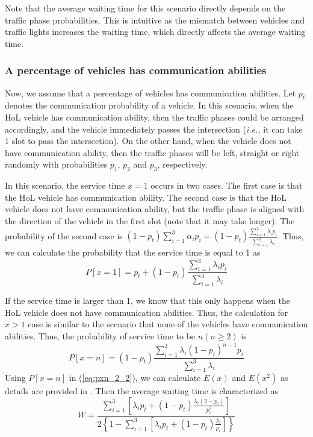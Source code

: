 \documentclass[conference]{IEEEtran}
\newcommand{\ie}{{\em i.e., }}
\begin{document}
Note that the average waiting time for this scenario directly depends on the traffic phase probabilities. This is intuitive as the mismatch between vehicles and traffic lights increases the waiting time, which directly affects the average waiting time.



\subsubsection{A percentage of vehicles has communication abilities}\label{somecarcantellmodel1}
Now, we assume that a percentage of vehicles has communication abilities. Let $p_t$ denotes the communication probability of a vehicle. In this scenario, when the HoL vehicle has communication ability, then the traffic phases could be arranged accordingly, and the vehicle immediately passes the intersection (\ie it can take 1 slot to pass the intersection). On the other hand, when the vehicle does not have communication ability, then the traffic phases will be left, straight or right randomly with probabilities $p_1$, $p_2$ and $p_3$, respectively.

In this scenario, the service time $x=1$ occurs in two cases. The first case is that the HoL vehicle has communication ability. The second case is that the HoL vehicle does not have communication ability, but the traffic phase is aligned with the direction of the vehicle in the first slot (note that it may take longer). The probability of the second case is $(1-p_t)\sum\limits_{i=1}^{3}\alpha_ip_i=(1-p_t)\frac{\sum_{i=1}^{3}\lambda_ip_i}{\sum_{i=1}^{3}\lambda_i}$. Thus, we can calculate the probability that the service time is equal to  1 as
\begin{equation}
P[x=1]=p_t+(1-p_t)\frac{\sum_{i=1}^{3}\lambda_ip_i}{\sum_{i=1}^{3}\lambda_i}
\end{equation}

If the service time is larger than 1, we know that this only happens when the HoL vehicle does not have communication abilities. Thus, the calculation for $x>1$ case is similar to the scenario that none of the vehicles have communication abilities. Thus, the probability of service time to be $n (n \geq 2)$ is
\begin{equation} \label{eq:pxn_2_2}
P[x=n]=(1-p_t)\frac{\sum_{i=1}^{3}\lambda_i(1-p_i)^{n-1}p_i}{\sum_{i=1}^{3}\lambda_i}
\end{equation} 
Using $P[x=n]$ in (\ref{eq:pxn_2_2}), we can calculate $E(x)$ and $E(x^2)$ as details are provided in \cite{this_tech}. Then the average waiting time is characterized as 
\begin{equation} \label{waitingtime_model1}
W=\frac{\sum_{i=1}^{3}\left[\lambda_ip_t+(1-p_t)\frac{\lambda_i(2-p_i)}{p_i^2}\right]}{2\left\lbrace 1-\sum_{i=1}^{3}\left[\lambda_i p_t+(1-p_t)\frac{\lambda_i}{p_i}\right]\right\rbrace}
\end{equation}
\end{document}
